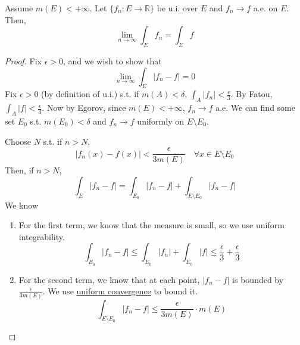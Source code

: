   \begin{theorem}
    \label{thm:vitali-convergence-theorem}
    Assume $m(E) < +\infty$. Let $\{f_n: E \to \mathbb{R}\}$ be u.i. over $E$ and $f_n \to f$ a.e. on $E$. Then, 
    \begin{equation}
      \lim_{n \to \infty} \int_E f_n = \int_E f
    \end{equation}
  \end{theorem}
  \begin{proof}
    Fix $\epsilon > 0$, and we wish to show that 
    \begin{equation}
      \lim_{n \to \infty} \int_E |f_n - f| = 0
    \end{equation}
    Fix $\epsilon > 0$ (by definition of u.i.) s.t. if $m(A) < \delta$, $\int_A |f_n| < \frac{\epsilon}{3}$. By Fatou, $\int_A |f| < \frac{\epsilon}{3}$. Now by Egorov, since $m(E) < +\infty$, $f_n \to f$ a.e. We can find some set $E_0$ s.t. $m(E_0) < \delta$ and $f_n \to f$ uniformly on $E \setminus E_0$. 

    Choose $N$ s.t. if $n > N$, 
    \begin{equation}
      |f_n (x) - f(x)| < \frac{\epsilon}{3 m(E)} \quad \forall x \in E \setminus E_0
    \end{equation}
    Then, if $n > N$, 
    \begin{equation}
      \int_E |f_n - f| = \int_{E_0} |f_n - f| + \int_{E \setminus E_0} |f_n - f|
    \end{equation}
    We know 
    \begin{enumerate}
      \item For the first term, we know that the measure is small, so we use uniform integrability. 
      \begin{equation}
        \int_{E_0} |f_n - f| \leq \int_{E_0} |f_n| + \int_{E_0} |f| \leq \frac{\epsilon}{3} + \frac{\epsilon}{3} 
      \end{equation}

      \item For the second term, we know that at each point, $|f_n - f|$ is bounded by $\frac{\epsilon}{3 m(E)}$. We use \hyperref[real-def:uniform-convergence]{uniform convergence} to bound it. 
      \begin{equation}
        \int_{E \setminus E_0} |f_n - f| \leq \frac{\epsilon}{3 m(E)} \cdot m(E)
      \end{equation}
    \end{enumerate}
  \end{proof}

